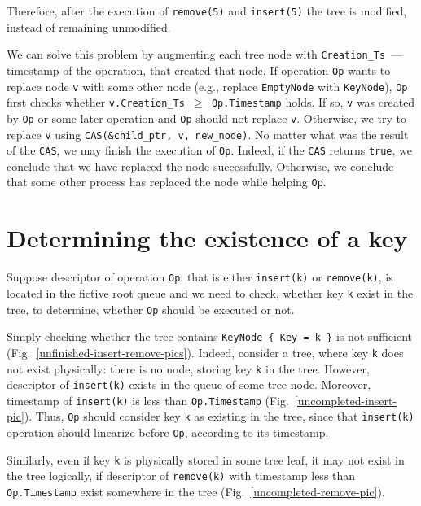 \documentclass[times, dvipsnames,%
               languages={russian,english} %
              ]{itmo-student-thesis}
\begin{document}
Therefore, after the execution of \texttt{remove(5)} and \texttt{insert(5)} the tree is modified, instead of remaining unmodified.

We can solve this problem by augmenting each tree node with \texttt{Creation\_Ts}~--- timestamp of the operation, that created that node. If operation \texttt{Op} wants to replace node \texttt{v} with some other node (e.g., replace \texttt{EmptyNode} with \texttt{KeyNode}), \texttt{Op} first checks whether \texttt{v.Creation\_Ts $\geq$ Op.Timestamp} holds. If so, \texttt{v} was created by \texttt{Op} or some later operation and \texttt{Op} should not replace \texttt{v}. Otherwise, we try to replace \texttt{v} using \texttt{CAS(\&child\_ptr, v, new\_node)}. No matter what was the result of the \texttt{CAS}, we may finish the execution of \texttt{Op}. Indeed, if the \texttt{CAS} returns \texttt{true}, we conclude that we have replaced the node successfully. Otherwise, we conclude that some other process has replaced the node while helping \texttt{Op}.

\section{Determining the existence of a key}
\label{key-exists-section}

Suppose descriptor of operation \texttt{Op}, that is either \texttt{insert(k)} or \texttt{remove(k)}, is located in the fictive root queue and we need to check, whether key \texttt{k} exist in the tree, to determine, whether \texttt{Op} should be executed or not. 

Simply checking whether the tree contains \texttt{KeyNode \{ Key = k \}} is not sufficient (Fig.~\ref{unfinished-insert-remove-pics}). Indeed, consider a tree, where key \texttt{k} does not exist physically: there is no node, storing key \texttt{k} in the tree. However, descriptor of \texttt{insert(k)} exists in the queue of some tree node. Moreover, timestamp of \texttt{insert(k)} is less than \texttt{Op.Timestamp} (Fig.~\ref{uncompleted-insert-pic}). Thus, \texttt{Op} should consider key \texttt{k} as existing in the tree, since that \texttt{insert(k)} operation should linearize before \texttt{Op}, according to its timestamp. 

Similarly, even if key \texttt{k} is physically stored in some tree leaf, it may not exist in the tree logically, if descriptor of \texttt{remove(k)} with timestamp less than \texttt{Op.Timestamp} exist somewhere in the tree (Fig.~\ref{uncompleted-remove-pic}).
\end{document}
